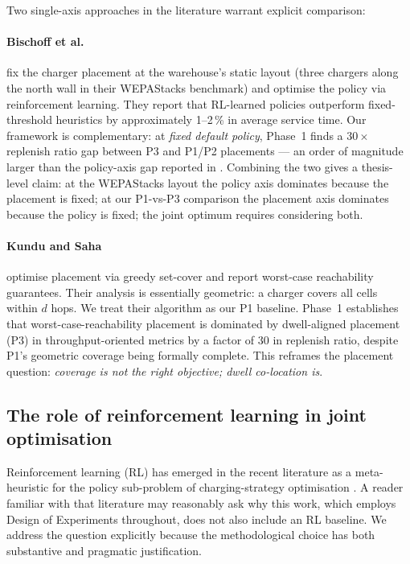 \documentclass[conference]{IEEEtran}
\begin{document}
Two single-axis approaches in the literature warrant explicit comparison:

\paragraph{Bischoff et al. \cite{bischoff2025}} fix the charger placement at the warehouse's static layout (three chargers along the north wall in their WEPAStacks benchmark) and optimise the policy via reinforcement learning. They report that RL-learned policies outperform fixed-threshold heuristics by approximately 1--2\,\% in average service time. Our framework is complementary: at \emph{fixed default policy}, Phase~1 finds a $30{\times}$ replenish ratio gap between P3 and P1/P2 placements --- an order of magnitude larger than the policy-axis gap reported in \cite{bischoff2025}. Combining the two gives a thesis-level claim: at the WEPAStacks layout the policy axis dominates because the placement is fixed; at our P1-vs-P3 comparison the placement axis dominates because the policy is fixed; the joint optimum requires considering both.

\paragraph{Kundu and Saha \cite{kundu2023}} optimise placement via greedy set-cover and report worst-case reachability guarantees. Their analysis is essentially geometric: a charger covers all cells within $d$ hops. We treat their algorithm as our P1 baseline. Phase~1 establishes that worst-case-reachability placement is dominated by dwell-aligned placement (P3) in throughput-oriented metrics by a factor of 30 in replenish ratio, despite P1's geometric coverage being formally complete. This reframes the placement question: \emph{coverage is not the right objective; dwell co-location is}.

\subsection{The role of reinforcement learning in joint optimisation}
\label{sec:rl_role}

Reinforcement learning (RL) has emerged in the recent literature as a meta-heuristic for the policy sub-problem of charging-strategy optimisation \cite{lin2023,deng2020,mu2022,singh2024,bischoff2025}. A reader familiar with that literature may reasonably ask why this work, which employs Design of Experiments throughout, does not also include an RL baseline. We address the question explicitly because the methodological choice has both substantive and pragmatic justification.
\end{document}
